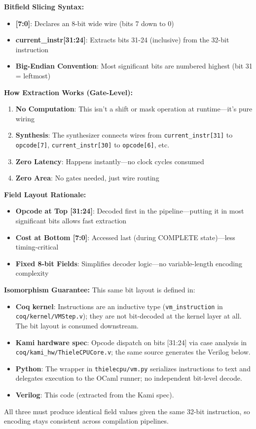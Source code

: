 \textbf{Bitfield Slicing Syntax:}
\begin{itemize}
    \item \textbf{[7:0]}: Declares an 8-bit wide wire (bits 7 down to 0)
    \item \textbf{current\_instr[31:24]}: Extracts bits 31-24 (inclusive) from the 32-bit instruction
    \item \textbf{Big-Endian Convention}: Most significant bits are numbered highest (bit 31 = leftmost)
\end{itemize}

\textbf{How Extraction Works (Gate-Level):}
\begin{enumerate}
    \item \textbf{No Computation}: This isn't a shift or mask operation at runtime—it's pure wiring
    \item \textbf{Synthesis}: The synthesizer connects wires from \texttt{current\_instr[31]} to \texttt{opcode[7]}, \texttt{current\_instr[30]} to \texttt{opcode[6]}, etc.
    \item \textbf{Zero Latency}: Happens instantly—no clock cycles consumed
    \item \textbf{Zero Area}: No gates needed, just wire routing
\end{enumerate}

\textbf{Field Layout Rationale:}
\begin{itemize}
    \item \textbf{Opcode at Top [31:24]}: Decoded first in the pipeline—putting it in most significant bits allows fast extraction
    \item \textbf{Cost at Bottom [7:0]}: Accessed last (during COMPLETE state)—less timing-critical
    \item \textbf{Fixed 8-bit Fields}: Simplifies decoder logic—no variable-length encoding complexity
\end{itemize}

\textbf{Isomorphism Guarantee:} This same bit layout is defined in:
\begin{itemize}
    \item \textbf{Coq kernel}: Instructions are an inductive type (\texttt{vm\_instruction} in \texttt{coq/kernel/VMStep.v}); they are not bit-decoded at the kernel layer at all. The bit layout is consumed downstream.
    \item \textbf{Kami hardware spec}: Opcode dispatch on bits [31:24] via case analysis in \texttt{coq/kami\_hw/ThieleCPUCore.v}; the same source generates the Verilog below.
    \item \textbf{Python}: The wrapper in \texttt{thielecpu/vm.py} serializes instructions to text and delegates execution to the OCaml runner; no independent bit-level decode.
    \item \textbf{Verilog}: This code (extracted from the Kami spec).
\end{itemize}
All three must produce identical field values given the same 32-bit instruction, so encoding stays consistent across compilation pipelines.

